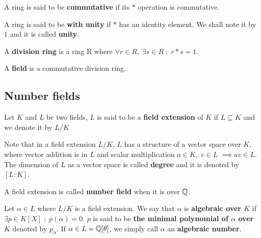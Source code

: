 \documentclass[a4paper,12pt]{article}
\begin{document}
\begin{definition}
  A ring is said to be \textbf{commutative} if its $*$ operation is commutative.
\end{definition}

\begin{definition}
  A ring is said to be \textbf{with unity} if $*$ has an identity element. We
  shall note it by $1$ and it is called \textbf{unity}.

\end{definition}

\begin{definition}
  A \textbf{division ring} is a ring R where $\forall r \in R, \; \exists s \in R \; ; \; r*s = 1$.
\end{definition}

\begin{definition}
  A \textbf{field} is a commutative division ring.
\end{definition}

\subsection{Number fields}
\label{sec:orgaca6fc9}

   \begin{definition}
  Let $K$ and $L$ be two fields, $L$ is said to be a \textbf{field extension} of
  $K$ if $L \subseteq K$ and we denote it by $L/K$
\end{definition}

Note that in a field extension \(L/K\), \(L\) has a structure of a vector space over
\(K\), where vector addition is in \(L\) and scalar multiplication \(a \in K, \; v \in L
   \; \implies av \in L\). The dimension of \(L\) as a vector space is called
\textbf{degree} and it is denoted by \([L:K]\).

\begin{definition}
  A field extension is called \textbf{number field} when it is over $\mathbb{Q}$.
\end{definition}

\begin{definition}
  Let $\alpha \in L$ where $L/K$ is a field extension. We say that $\alpha$ is
  \textbf{algebraic over $K$} if $\exists p \in K[X] \;;\; p(\alpha) = 0$. $p$ is said to be
  \textbf{the minimal polynomial of $\alpha$ over $K$} denoted by $p_\alpha$. If $\alpha \in L =
  \mathbb{Q}[\theta]$, we simply call $\alpha$ an \textbf{algebraic number}.
\end{definition}
\end{document}
